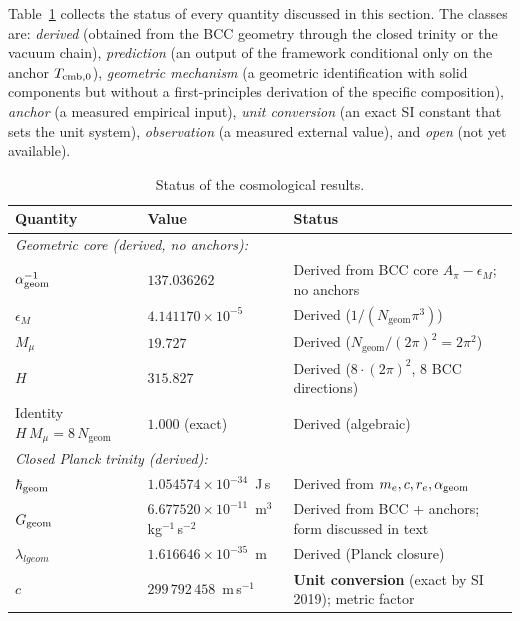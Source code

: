 \documentclass[10pt,a4paper]{article}
\begin{document}
Table~\ref{tab:summary_status} collects the status of every quantity
discussed in this section. The classes are: \emph{derived} (obtained
from the BCC geometry through the closed trinity or the vacuum
chain), \emph{prediction} (an output of the framework conditional
only on the anchor \(T_{\rm cmb,0}\)), \emph{geometric mechanism} (a
geometric identification with solid components but without a
first-principles derivation of the specific composition),
\emph{anchor} (a measured empirical input), \emph{unit conversion}
(an exact SI constant that sets the unit system), \emph{observation}
(a measured external value), and \emph{open} (not yet available).

\begin{table}[H]
	\centering
	\footnotesize
	\caption{Status of the cosmological results.}
	\label{tab:summary_status}
	\begin{tabularx}{\textwidth}{@{}l l X@{}}
		\toprule
		\textbf{Quantity} & \textbf{Value} & \textbf{Status} \\
		\midrule
		\multicolumn{3}{l}{\textit{Geometric core (derived, no anchors):}} \\
		\(\alpha_{\rm geom}^{-1}\)       & \(137.036262\)           & Derived from BCC core $A_\pi - \epsilon_M$; no anchors \\
		\(\epsilon_M\)                  & \(4.141170\times 10^{-5}\) & Derived (\(1/(N_{\text{geom}}\pi^3)\)) \\
		\(M_\mu\)                       & \(19.727\)              & Derived (\(N_{\text{geom}}/(2\pi)^2 = 2\pi^2\)) \\
		\(H\)                           & \(315.827\)             & Derived (\(8\cdot(2\pi)^2\), 8 BCC directions) \\
		Identity \(H\,M_\mu = 8\,N_{\text{geom}}\) & \(1.000\) (exact) & Derived (algebraic) \\
		\midrule
		\multicolumn{3}{l}{\textit{Closed Planck trinity (derived):}} \\
		\(\hbar_{\rm geom}\)             & \(1.054574\times 10^{-34}\)~J\,s & Derived from $m_e, c, r_e, \alpha_{\rm geom}$ \\
		\(G_{\rm geom}\)                 & \(6.677520\times 10^{-11}\)~m\(^3\)\,kg\(^{-1}\)\,s\(^{-2}\) & Derived from BCC + anchors; form discussed in text \\
		\(\lambda_{l geom}\)      & \(1.616646\times 10^{-35}\)~m & Derived (Planck closure) \\
		\midrule
		\(c\)                            & \(299\,792\,458\)~m\,s\(^{-1}\) & \textbf{Unit conversion} (exact by SI 2019); metric factor \\

\end{tabularx}
\end{table}
\end{document}
